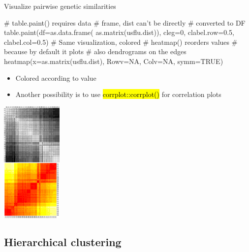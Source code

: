 \documentclass[compress, ucs, xelatex, 11pt, xcolor=svgnames,
	hyperref={
		bookmarks=true,
		unicode=true,
		colorlinks=true,
		pdftitle={Molecular data in R},
		plainpages=false,
		pdfauthor={Vojtech Zeisek},
		pdfsubject={Course about phylogeny and evolution in R},
		pdfcreator={XeLaTeX},
		pdfkeywords={R, evolution, phylogeny, molecular data},
		linkcolor=Tomato,
		anchorcolor=SaddleBrown,
		citecolor=Goldenrod,
		filecolor=DarkMagenta,
		menucolor=Sienna,
		urlcolor=DarkTurquoise,
		pdftex},
	url={hyphens, lowtilde} %
	]{beamer}
\renewcommand{\texttt}[1]{\hl{\ttfamily #1}}
\begin{document}
\begin{frame}[fragile]{Visualize pairwise genetic similarities}
	\begin{multicols}{2}
		\vfil
		\begin{spluscode}
    # table.paint() requires data
    # frame, dist can't be directly
    # converted to DF
    table.paint(df=as.data.frame(
      as.matrix(usflu.dist)), cleg=0,
      clabel.row=0.5, clabel.col=0.5)
    # Same visualization, colored
    # heatmap() reorders values
    # because by default it plots
    # also dendrograms on the edges
    heatmap(x=as.matrix(usflu.dist),
      Rowv=NA, Colv=NA, symm=TRUE)
		\end{spluscode}
		\vfill
		\begin{itemize}
			\item Colored according to value
			\item Another possibility is to use \texttt{corrplot::corrplot()} for correlation plots
		\end{itemize}
		\columnbreak
		\begin{center}
			\includegraphics[height=6cm]{dna-dists.png}
		\end{center}
	\end{multicols}
\end{frame}

\subsection{Hierarchical clustering}
\end{document}
